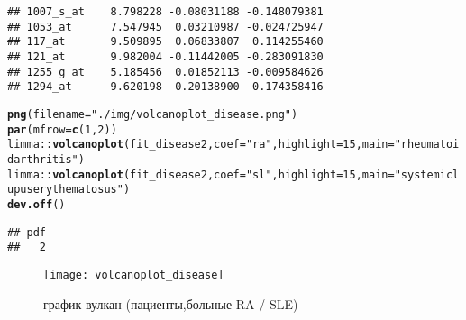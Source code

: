 \documentclass{article}
\makeatletter
\newcommand{\hlnum}[1]{\textcolor[rgb]{0.686,0.059,0.569}{#1}}%
\newcommand{\hlstr}[1]{\textcolor[rgb]{0.192,0.494,0.8}{#1}}%
\newcommand{\hlopt}[1]{\textcolor[rgb]{0,0,0}{#1}}%
\newcommand{\hlstd}[1]{\textcolor[rgb]{0.345,0.345,0.345}{#1}}%
\newcommand{\hlkwc}[1]{\textcolor[rgb]{0.333,0.667,0.333}{#1}}%
\newcommand{\hlkwd}[1]{\textcolor[rgb]{0.737,0.353,0.396}{\textbf{#1}}}%
\newenvironment{kframe}{%
 \def\at@end@of@kframe{}%
 \ifinner\ifhmode%
  \def\at@end@of@kframe{\end{minipage}}%
  \begin{minipage}{\columnwidth}%
 \fi\fi%
 \def\FrameCommand##1{\hskip\@totalleftmargin \hskip-\fboxsep
 \colorbox{shadecolor}{##1}\hskip-\fboxsep
     \hskip-\linewidth \hskip-\@totalleftmargin \hskip\columnwidth}%
 \MakeFramed {\advance\hsize-\width
   \@totalleftmargin\z@ \linewidth\hsize
   \@setminipage}}%
 {\par\unskip\endMakeFramed%
 \at@end@of@kframe}
\newenvironment{knitrout}{}{} %
\makeatother
\begin{document}
\begin{knitrout}
\begin{kframe}
\begin{verbatim}
## 1007_s_at    8.798228 -0.08031188 -0.148079381
## 1053_at      7.547945  0.03210987 -0.024725947
## 117_at       9.509895  0.06833807  0.114255460
## 121_at       9.982004 -0.11442005 -0.283091830
## 1255_g_at    5.185456  0.01852113 -0.009584626
## 1294_at      9.620198  0.20138900  0.174358416
\end{verbatim}
\begin{alltt}
\hlkwd{png}\hlstd{(}\hlkwc{filename} \hlstd{=} \hlstr{"./img/volcanoplot_disease.png"}\hlstd{)}
\hlkwd{par}\hlstd{(}\hlkwc{mfrow} \hlstd{=} \hlkwd{c}\hlstd{(}\hlnum{1}\hlstd{,} \hlnum{2}\hlstd{))}
\hlstd{limma}\hlopt{::}\hlkwd{volcanoplot}\hlstd{(fit_disease2,} \hlkwc{coef} \hlstd{=} \hlstr{"ra"}\hlstd{,} \hlkwc{highlight} \hlstd{=} \hlnum{15}\hlstd{,} \hlkwc{main} \hlstd{=} \hlstr{"rheumatoid arthritis"}\hlstd{)}
\hlstd{limma}\hlopt{::}\hlkwd{volcanoplot}\hlstd{(fit_disease2,} \hlkwc{coef} \hlstd{=} \hlstr{"sl"}\hlstd{,} \hlkwc{highlight} \hlstd{=} \hlnum{15}\hlstd{,} \hlkwc{main} \hlstd{=} \hlstr{"systemic lupus erythematosus"}\hlstd{)}
\hlkwd{dev.off}\hlstd{()}
\end{alltt}
\begin{verbatim}
## pdf
##   2
\end{verbatim}
\end{kframe}
\end{knitrout}

\begin{figure}[H]
    \centering
    \texttt{[image: volcanoplot\_disease]}
    \caption{график-вулкан (пациенты,больные RA / SLE)}
\end{figure}
\end{document}
